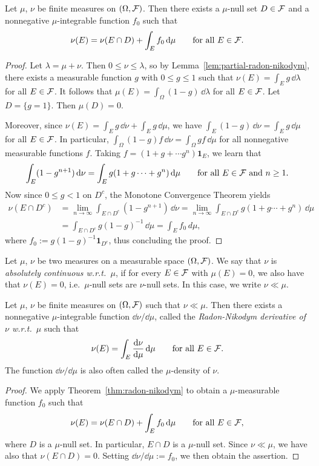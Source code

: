 \begin{theorem}\label{thm:radon-nikodym}
	Let $\mu$, $\nu$ be finite measures on $(\Omega,\mathcal F)$. Then there exists a $\mu$-null set $D\in\mathcal F$ and a nonnegative $\mu$-integrable function $f_0$ such that
	\[
		\nu(E) = \nu(E\cap D) + \int_E f_0\,\mathrm{d}\mu\qquad\text{for all $E\in\mathcal F$}.
	\]
\end{theorem}
\begin{proof}
	Let $\lambda=\mu+\nu$. Then $0\le \nu\le \lambda$, so by Lemma~\ref{lem:partial-radon-nikodym}, there exists a measurable function $g$ with $0\le g\le 1$ such that $\nu(E)=\int_E g\,\dd\lambda$ for all $E\in\mathcal F$. It follows that
	$\mu(E) = \int_\Omega (1-g)\,\dd\lambda$ for all $E\in\mathcal F$. Let $D=\{g=1\}$. Then $\mu(D) = 0$. 
	
	Moreover, since $\nu(E)=\int_E g\,\dd\nu + \int_E g\,\dd\mu$, we have $\int_E (1-g)\,\dd\nu = \int_E g\,\dd\mu$ for all $E\in\mathcal F$. In particular, $\int_\Omega (1-g)f\,\dd\nu = \int_\Omega gf\,\dd\mu$ for all nonnegative measurable functions $f$. Taking $f=(1+g +\cdots g^n)\mathbf{1}_E$, we learn that
	\[
		\int_E (1-g^{n+1})\,\mathrm{d}\nu = \int_E g(1+g\cdots+g^n)\,\mathrm{d}\mu\qquad\text{for all $E\in\mathcal F$ and $n\ge 1$}.
	\]
	Now since $0\le g <1$ on $D^c$, the Monotone Convergence Theorem yields
	\begin{align*}
		\nu(E\cap D^c) &= \lim_{n\to\infty} \int_{E\cap D^c} (1-g^{n+1})\,\dd\nu = \lim_{n\to\infty}\int_{E\cap D^c} g(1+g\cdots+g^n)\,\dd\mu \\
		&=\int_{E\cap D^c} g(1-g)^{-1}\,\dd\mu = \int_E f_0\,d\mu,
	\end{align*}
	where $f_0:= g(1-g)^{-1}\mathbf{1}_{D^c}$, thus concluding the proof.
\end{proof}

\begin{definition}
	Let $\mu$, $\nu$ be two measures on a measurable space $(\Omega, \mathcal F)$.
	We say that $\nu$ is \emph{absolutely continuous w.r.t.\ $\mu$}, if for every $E\in\mathcal F$ with $\mu(E)=0$, we also have that $\nu(E)=0$, i.e.\ $\mu$-null sets are $\nu$-null sets. In this case, we write $\nu\ll\mu$.
\end{definition}

\begin{theorem} 
	Let $\mu$, $\nu$ be finite measures on $(\Omega,\mathcal F)$ such that $\nu\ll \mu$. Then there exists a nonnegative $\mu$-integrable function $\dd\nu/\dd\mu$, called the \emph{Radon-Nikodym derivative of $\nu$ w.r.t.\ $\mu$} such that
	\[
		\nu(E) = \int_E \frac{\mathrm{d}\nu}{\mathrm{d}\mu}\,\mathrm{d}\mu\qquad\text{for all $E\in\mathcal F$}.
	\]
	The function $\dd\nu/\dd\mu$ is also often called the $\mu$-density of $\nu$.
\end{theorem}
\begin{proof}
	We apply Theorem~\ref{thm:radon-nikodym} to obtain a $\mu$-measurable function $f_0$ such that
	\[
		\nu(E) = \nu(E\cap D) + \int_E f_0\,\mathrm{d}\mu \qquad\text{for all $E\in\mathcal F$},
	\]
	where $D$ is a $\mu$-null set. In particular, $E\cap D$ is a $\mu$-null set. Since $\nu\ll \mu$, we have also that $\nu(E\cap D)=0$. Setting $\dd\nu/\dd\mu:= f_0$, we then obtain the assertion.
\end{proof}

